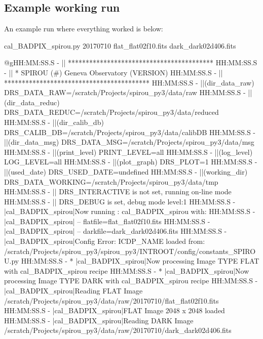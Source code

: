 \newpage
\subsection{Example working run}

An example run where everything worked is below:

\begin{cmdbox}[title={example}]
cal_BADPIX_spirou.py 20170710 flat_flat02f10.fits dark_dark02d406.fits
\end{cmdbox}
\begin{cmdboxprintspecial}
@gHH:MM:SS.S -   || *****************************************
HH:MM:SS.S -   || * SPIROU \@(#) Geneva Observatory (VERSION)
HH:MM:SS.S -   || *****************************************
HH:MM:SS.S -   ||(dir_data_raw)      DRS_DATA_RAW=/scratch/Projects/spirou_py3/data/raw
HH:MM:SS.S -   ||(dir_data_reduc)    DRS_DATA_REDUC=/scratch/Projects/spirou_py3/data/reduced
HH:MM:SS.S -   ||(dir_calib_db)      DRS_CALIB_DB=/scratch/Projects/spirou_py3/data/calibDB
HH:MM:SS.S -   ||(dir_data_msg)      DRS_DATA_MSG=/scratch/Projects/spirou_py3/data/msg
HH:MM:SS.S -   ||(print_level)       PRINT_LEVEL=all         %
HH:MM:SS.S -   ||(log_level)         LOG_LEVEL=all         %
HH:MM:SS.S -   ||(plot_graph)        DRS_PLOT=1            %
HH:MM:SS.S -   ||(used_date)         DRS_USED_DATE=undefined
HH:MM:SS.S -   ||(working_dir)       DRS_DATA_WORKING=/scratch/Projects/spirou_py3/data/tmp
HH:MM:SS.S -   ||                    DRS_INTERACTIVE is not set, running on-line mode
HH:MM:SS.S -   ||                    DRS_DEBUG is set, debug mode level:1
HH:MM:SS.S -   |cal_BADPIX_spirou|Now running : cal_BADPIX_spirou with:
HH:MM:SS.S -   |cal_BADPIX_spirou|       -- flatfile=flat_flat02f10.fits
HH:MM:SS.S -   |cal_BADPIX_spirou|       -- darkfile=dark_dark02d406.fits
HH:MM:SS.S -   |cal_BADPIX_spirou|Config Error: ICDP_NAME loaded from: /scratch/Projects/spirou_py3/spirou_py3/INTROOT/config/constants_SPIROU.py
HH:MM:SS.S - * |cal_BADPIX_spirou|Now processing Image TYPE FLAT with cal_BADPIX_spirou recipe
HH:MM:SS.S - * |cal_BADPIX_spirou|Now processing Image TYPE DARK with cal_BADPIX_spirou recipe
HH:MM:SS.S -   |cal_BADPIX_spirou|Reading FLAT Image /scratch/Projects/spirou_py3/data/raw/20170710/flat_flat02f10.fits
HH:MM:SS.S -   |cal_BADPIX_spirou|FLAT Image 2048 x 2048 loaded
HH:MM:SS.S -   |cal_BADPIX_spirou|Reading DARK Image /scratch/Projects/spirou_py3/data/raw/20170710/dark_dark02d406.fits

\end{cmdboxprintspecial}
